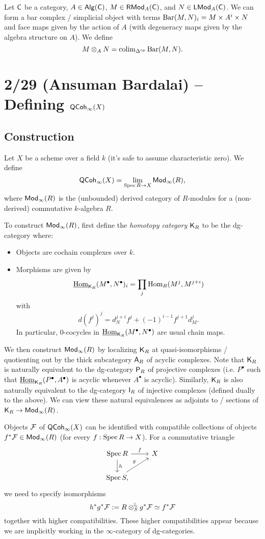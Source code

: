 \documentclass{article}
\begin{document}
Let $\mathsf{C}$ be a category, $A \in \mathsf{Alg}(\mathsf{C})$, $M \in \mathsf{RMod}_A(\mathsf{C})$, and $N \in \mathsf{LMod}_A(\mathsf{C})$.
We can form a bar complex / simplicial object with terms $\operatorname{Bar}(M, N)_i = M \times A^i \times N$ and face maps given by the action of $A$ (with degeneracy maps given by the algebra structure on $A$).
We define
\[
	M \otimes_A N = \operatorname{colim}_{\Delta^{\mathrm{op}}} \operatorname{Bar}(M, N).
\]

\section{2/29 (Ansuman Bardalai) -- Defining $\mathsf{QCoh}_\infty(X)$}

\subsection{Construction}

Let $X$ be a scheme over a field $k$ (it's safe to assume characteristic zero).
We define
\[
	\mathsf{QCoh}_\infty(X) = \lim_{\operatorname{Spec} R \to X} \mathsf{Mod}_\infty(R),
\]
where $\mathsf{Mod}_\infty(R)$ is the (unbounded) derived category of $R$-modules for a (non-derived) commutative $k$-algebra $R$.

To construct $\mathsf{Mod}_\infty(R)$, first define the \emph{homotopy category} $\mathsf{K}_R$ to be the dg-category where:
\begin{itemize}
	\item Objects are cochain complexes over $k$.
	\item Morphisms are given by 
		\[
			\underline{\operatorname{Hom}}_{\mathsf{K}_R}(M^\bullet, N^\bullet)_i = \prod_j \operatorname{Hom}_R(M^j, M^{j+i})
		\]
		with
		\[
			d(f^j)^j = d_N^{j+i} f^j + (-1)^{i-1} f^{j+1} d^j_M.
		\]
		In particular, $0$-cocycles in $\underline{\operatorname{Hom}}_{\mathsf{K}_R}(M^\bullet, N^\bullet)$ are usual chain maps.
\end{itemize}
We then construct $\mathsf{Mod}_\infty(R)$ by localizing $\mathsf{K}_R$ at quasi-isomorphisms / quotienting out by the thick subcategory $\mathsf{A}_R$ of acyclic complexes.
Note that $\mathsf{K}_R$ is naturally equivalent to the dg-category $\mathsf{P}_R$ of projective complexes (i.e. $P^\bullet$ such that $\underline{\operatorname{Hom}}_{\mathsf{K}_R}(P^\bullet, A^\bullet)$ is acyclic whenever $A^\bullet$ is acyclic).
Similarly, $\mathsf{K}_R$ is also naturally equivalent to the dg-category $\mathsf{I}_R$ of injective complexes (defined dually to the above).
We can view these natural equivalences as adjoints to / sections of $\mathsf{K}_R \to \mathsf{Mod}_\infty(R)$.

Objects $\mathcal{F}$ of $\mathsf{QCoh}_\infty(X)$ can be identified with compatible collections of objects $f^* \mathcal{F} \in \mathsf{Mod}_\infty(R)$ (for every $f: \operatorname{Spec} R \to X$).
For a commutative triangle
\[
	\begin{tikzcd}
		\Spec R \rar["f"] \dar["h"] & X \\
		\Spec S \ar[ur, "g"],
	\end{tikzcd}
\]
we need to specify isomorphisms
\[
	h^* g^* \mathcal{F} := R \otimes_S^{\mathbb{L}} g^* \mathcal{F} \simeq f^* \mathcal{F}
\]
together with higher compatibilities.
These higher compatibilities appear because we are implicitly working in the $\infty$-category of dg-categories.
\end{document}
